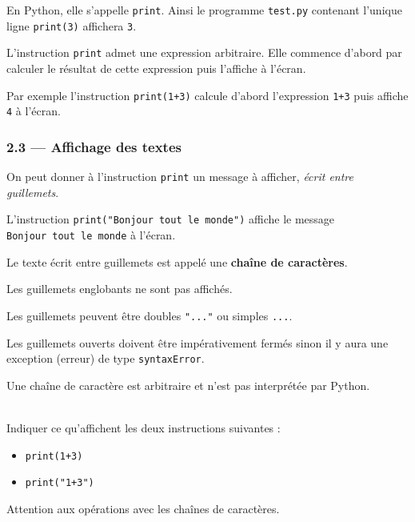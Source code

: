 \documentclass[a4paper,17pt]{extarticle}
\newenvironment{eleve}%
{\begin{activite}\color{noiramu}\\[-0.5cm]}
{\end{activite}}
\providecommand{\tightlist}{%
      \setlength{\itemsep}{0pt}\setlength{\parskip}{0pt}}
\begin{document}
En Python, elle s'appelle \texttt{print}. Ainsi le programme
\texttt{test.py} contenant l'unique ligne \texttt{print(3)} affichera
\texttt{3}.

    L'instruction \texttt{print} admet une expression arbitraire. Elle
commence d'abord par calculer le résultat de cette expression puis
l'affiche à l'écran.

Par exemple l'instruction \texttt{print(1+3)} calcule d'abord
l'expression \texttt{1+3} puis affiche \texttt{4} à l'écran.

    \hypertarget{affichage-des-textes}{%
\subsubsection{2.3 --- Affichage des
textes}\label{affichage-des-textes}}

On peut donner à l'instruction \texttt{print} un message à afficher,
\emph{écrit entre guillemets}.

L'instruction \texttt{print("Bonjour\ tout\ le\ monde")} affiche le
message \texttt{Bonjour\ tout\ le\ monde} à l'écran.
\begin{retenir}
    Le texte écrit entre guillemets est appelé une \textbf{chaîne de
caractères}.

        \end{retenir}\begin{remarque}
    Les guillemets englobants ne sont pas affichés.

Les guillemets peuvent être doubles \texttt{"..."} ou simples
\texttt{\textquotesingle{}...\textquotesingle{}}.

Les guillemets ouverts doivent être impérativement fermés sinon il y
aura une exception (erreur) de type \texttt{syntaxError}.

        \end{remarque}
    Une chaîne de caractère est arbitraire et n'est pas interprétée par
Python.
\begin{eleve}
    Indiquer ce qu'affichent les deux instructions suivantes :

\begin{itemize}
\tightlist
\item
  \texttt{print(1+3)}
\item
  \texttt{print("1+3")}
\end{itemize}
        
        \end{eleve}
    Attention aux opérations avec les chaînes de caractères.
\end{document}
